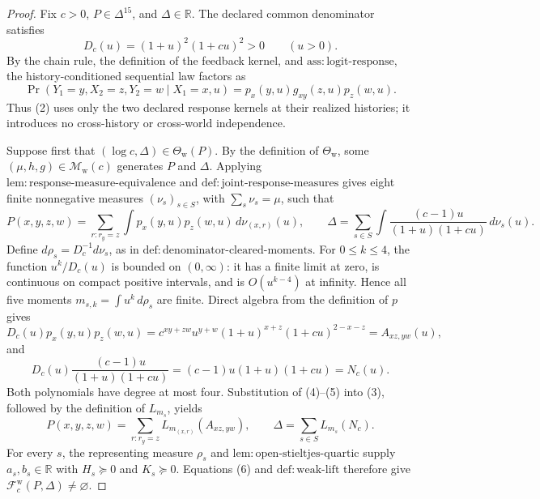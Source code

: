 \documentclass{article}
\begin{document}
\begin{proof}
Fix \(c>0\), \(P\in\Delta^{15}\), and \(\Delta\in\mathbb R\).  The declared common denominator satisfies
\[
 D_c(u)=(1+u)^2(1+cu)^2>0\qquad(u>0). \tag{1}
\]
By the chain rule, the definition of the feedback kernel, and \(\mathrm{ass{:}logit\text{-}response}\), the history-conditioned sequential law factors as
\[
 \Pr(Y_1=y,X_2=z,Y_2=w\mid X_1=x,u)
 =p_x(y,u)g_{xy}(z,u)p_z(w,u). \tag{2}
\]
Thus (2) uses only the two declared response kernels at their realized histories; it introduces no cross-history or cross-world independence.

Suppose first that \((\log c,\Delta)\in\Theta_{\mathrm w}(P)\).  By the definition of \(\Theta_{\mathrm w}\), some \((\mu,h,g)\in\mathcal M_{\mathrm w}(c)\) generates \(P\) and \(\Delta\).  Applying \(\mathrm{lem{:}response\text{-}measure\text{-}equivalence}\) and \(\mathrm{def{:}joint\text{-}response\text{-}measures}\) gives eight finite nonnegative measures \((\nu_s)_{s\in S}\), with \(\sum_s\nu_s=\mu\), such that
\[
 P(x,y,z,w)=\sum_{r:r_y=z}\int p_x(y,u)p_z(w,u)\,d\nu_{(x,r)}(u),
 \qquad
 \Delta=\sum_{s\in S}\int
 \frac{(c-1)u}{(1+u)(1+cu)}\,d\nu_s(u). \tag{3}
\]
Define \(d\rho_s=D_c^{-1}d\nu_s\), as in \(\mathrm{def{:}denominator\text{-}cleared\text{-}moments}\).  For \(0\le k\le4\), the function \(u^k/D_c(u)\) is bounded on \((0,\infty)\): it has a finite limit at zero, is continuous on compact positive intervals, and is \(O(u^{k-4})\) at infinity.  Hence all five moments \(m_{s,k}=\int u^k\,d\rho_s\) are finite.  Direct algebra from the definition of \(p\) gives
\[
 D_c(u)p_x(y,u)p_z(w,u)
 =c^{xy+zw}u^{y+w}(1+u)^{x+z}(1+cu)^{2-x-z}
 =A_{xz,yw}(u), \tag{4}
\]
and
\[
 D_c(u)\frac{(c-1)u}{(1+u)(1+cu)}
 =(c-1)u(1+u)(1+cu)=N_c(u). \tag{5}
\]
Both polynomials have degree at most four.  Substitution of (4)--(5) into (3), followed by the definition of \(L_{m_s}\), yields
\[
 P(x,y,z,w)=\sum_{r:r_y=z}L_{m_{(x,r)}}(A_{xz,yw}),
 \qquad
 \Delta=\sum_{s\in S}L_{m_s}(N_c). \tag{6}
\]
For every \(s\), the representing measure \(\rho_s\) and \(\mathrm{lem{:}open\text{-}stieltjes\text{-}quartic}\) supply \(a_s,b_s\in\mathbb R\) with \(H_s\succeq0\) and \(K_s\succeq0\).  Equations (6) and \(\mathrm{def{:}weak\text{-}lift}\) therefore give \(\mathcal F_c^{\mathrm w}(P,\Delta)\ne\varnothing\).


\end{proof}
\end{document}
